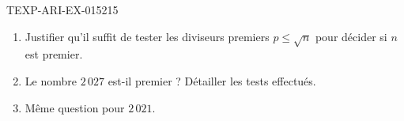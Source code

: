 \begin{exercice}{TEXP-ARI-EX-015}{2}{15}
\begin{enumerate}
  \item Justifier qu'il suffit de tester les diviseurs premiers $p\leq\sqrt{n}$
        pour décider si $n$ est premier.
  \item Le nombre $2\,027$ est-il premier ? Détailler les tests effectués.
  \item Même question pour $2\,021$.
\end{enumerate}
\end{exercice}
